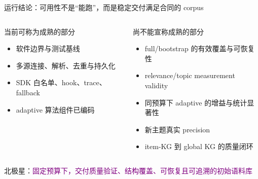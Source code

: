 \begin{frame}{运行结论：可用性不是“能跑”，而是稳定交付满足合同的 corpus}
\begin{columns}[T,onlytextwidth]
\begin{exampleblock}{当前可称为成熟的部分}
\begin{itemize}
  \item 软件边界与测试基线
  \item 多源连接、解析、去重与持久化
  \item SDK 白名单、hook、trace、fallback
  \item adaptive 算法组件已编码
\end{itemize}
\end{exampleblock}
\begin{alertblock}{尚不能宣称成熟的部分}
\begin{itemize}
  \item full/bootstrap 的有效覆盖与可恢复性
  \item relevance/topic measurement validity
  \item 同预算下 adaptive 的增益与统计显著性
  \item 新主题真实 precision
  \item item-KG 到 global KG 的质量闭环
\end{itemize}
\end{alertblock}
\end{columns}

\vspace{0.5em}
\begin{center}
\Large 北极星：\textcolor{Purple}{固定预算下，交付质量验证、结构覆盖、可恢复且可追溯的初始语料库}
\end{center}
\end{frame}

